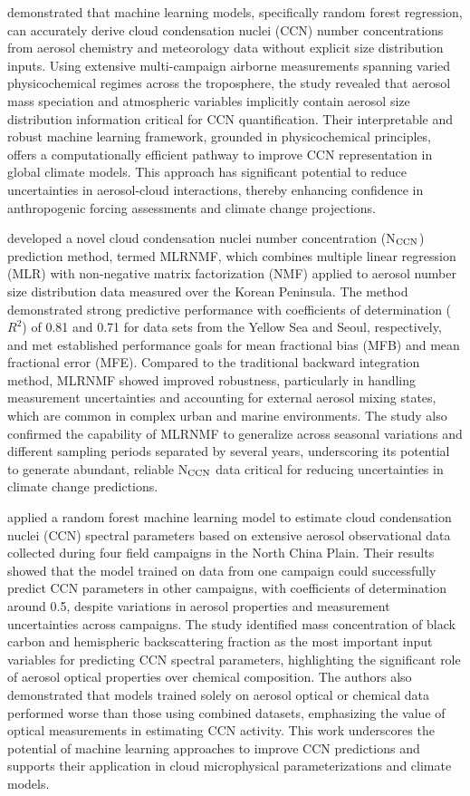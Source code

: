 \documentclass[11pt]{article}
\begin{document}
\citet{nair2021machine} demonstrated that machine learning models, specifically random forest regression, can accurately derive cloud condensation nuclei (CCN) number concentrations from aerosol chemistry and meteorology data without explicit size distribution inputs. Using extensive multi-campaign airborne measurements spanning varied physicochemical regimes across the troposphere, the study revealed that aerosol mass speciation and atmospheric variables implicitly contain aerosol size distribution information critical for CCN quantification. Their interpretable and robust machine learning framework, grounded in physicochemical principles, offers a computationally efficient pathway to improve CCN representation in global climate models. This approach has significant potential to reduce uncertainties in aerosol-cloud interactions, thereby enhancing confidence in anthropogenic forcing assessments and climate change projections.

\citet{park2023new} developed a novel cloud condensation nuclei number concentration (N$_{\rm CCN}$) prediction method, termed MLRNMF, which combines multiple linear regression (MLR) with non-negative matrix factorization (NMF) applied to aerosol number size distribution data measured over the Korean Peninsula. The method demonstrated strong predictive performance with coefficients of determination (\( R^2 \)) of 0.81 and 0.71 for data sets from the Yellow Sea and Seoul, respectively, and met established performance goals for mean fractional bias (MFB) and mean fractional error (MFE). Compared to the traditional backward integration method, MLRNMF showed improved robustness, particularly in handling measurement uncertainties and accounting for external aerosol mixing states, which are common in complex urban and marine environments. The study also confirmed the capability of MLRNMF to generalize across seasonal variations and different sampling periods separated by several years, underscoring its potential to generate abundant, reliable N$_{\rm CCN}$ data critical for reducing uncertainties in climate change predictions.

\citet{liang2022prediction} applied a random forest machine learning model to estimate cloud condensation nuclei (CCN) spectral parameters based on extensive aerosol observational data collected during four field campaigns in the North China Plain. Their results showed that the model trained on data from one campaign could successfully predict CCN parameters in other campaigns, with coefficients of determination around 0.5, despite variations in aerosol properties and measurement uncertainties across campaigns. The study identified mass concentration of black carbon and hemispheric backscattering fraction as the most important input variables for predicting CCN spectral parameters, highlighting the significant role of aerosol optical properties over chemical composition. The authors also demonstrated that models trained solely on aerosol optical or chemical data performed worse than those using combined datasets, emphasizing the value of optical measurements in estimating CCN activity. This work underscores the potential of machine learning approaches to improve CCN predictions and supports their application in cloud microphysical parameterizations and climate models.
\end{document}
